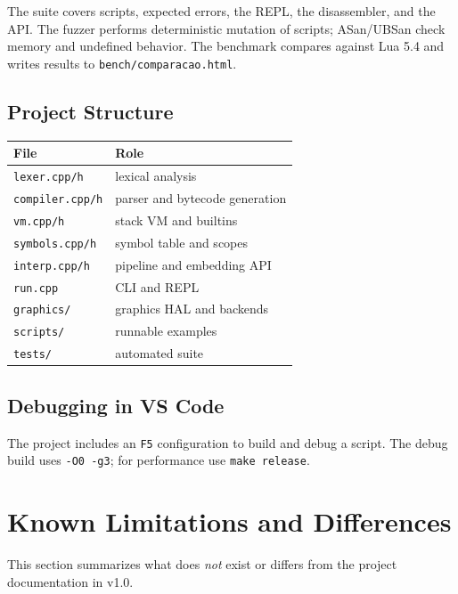 \documentclass[11pt,a4paper,oneside]{report}
\newcommand{\code}[1]{\texttt{#1}}
\newcommand{\file}[1]{\texttt{#1}}
\begin{document}
The suite covers scripts, expected errors, the REPL, the disassembler,
and the API. The fuzzer performs deterministic mutation of scripts;
ASan/UBSan check memory and undefined behavior. The benchmark compares
against Lua 5.4 and writes results to \file{bench/comparacao.html}.

\section{Project Structure}
\begin{center}
\begin{tabular}{L{4cm}L{10cm}}
\toprule
File & Role \\
\midrule
\file{lexer.cpp/h} & lexical analysis \\
\file{compiler.cpp/h} & parser and bytecode generation \\
\file{vm.cpp/h} & stack VM and builtins \\
\file{symbols.cpp/h} & symbol table and scopes \\
\file{interp.cpp/h} & pipeline and embedding API \\
\file{run.cpp} & CLI and REPL \\
\file{graphics/} & graphics HAL and backends \\
\file{scripts/} & runnable examples \\
\file{tests/} & automated suite \\
\bottomrule
\end{tabular}
\end{center}

\section{Debugging in VS Code}
The project includes an \code{F5} configuration to build and debug a
script. The debug build uses \code{-O0 -g3}; for performance use
\code{make release}.

\chapter{Known Limitations and Differences}
\label{cap:limitacoes}

This section summarizes what does \emph{not} exist or differs from the
project documentation in v1.0.
\end{document}
